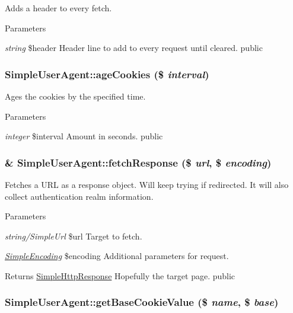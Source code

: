 \label{class_simple_user_agent_afa939a53c88a70147c399dbc3c8b664c}
Adds a header to every fetch. 
\begin{DoxyParams}{Parameters}
\item[{\em string}]\$header Header line to add to every request until cleared.  public \end{DoxyParams}
\hypertarget{class_simple_user_agent_aba32355b5660f25d62ca0e92114c9879}{
\subsubsection[{ageCookies}]{\setlength{\rightskip}{0pt plus 5cm}SimpleUserAgent::ageCookies (\$ {\em interval})}}
\label{class_simple_user_agent_aba32355b5660f25d62ca0e92114c9879}
Ages the cookies by the specified time. 
\begin{DoxyParams}{Parameters}
\item[{\em integer}]\$interval Amount in seconds.  public \end{DoxyParams}
\hypertarget{class_simple_user_agent_a8f80a93c41e5e7956ace91d133794a1d}{
\subsubsection[{fetchResponse}]{\setlength{\rightskip}{0pt plus 5cm}\& SimpleUserAgent::fetchResponse (\$ {\em url}, \/  \$ {\em encoding})}}
\label{class_simple_user_agent_a8f80a93c41e5e7956ace91d133794a1d}
Fetches a URL as a response object. Will keep trying if redirected. It will also collect authentication realm information. 
\begin{DoxyParams}{Parameters}
\item[{\em string/SimpleUrl}]\$url Target to fetch. \item[{\em \hyperlink{class_simple_encoding}{SimpleEncoding}}]\$encoding Additional parameters for request. \end{DoxyParams}
\begin{DoxyReturn}{Returns}
\hyperlink{class_simple_http_response}{SimpleHttpResponse} Hopefully the target page.  public 
\end{DoxyReturn}
\hypertarget{class_simple_user_agent_a4f6c882450bd4f5b89564dd468f95187}{
\subsubsection[{getBaseCookieValue}]{\setlength{\rightskip}{0pt plus 5cm}SimpleUserAgent::getBaseCookieValue (\$ {\em name}, \/  \$ {\em base})}}
